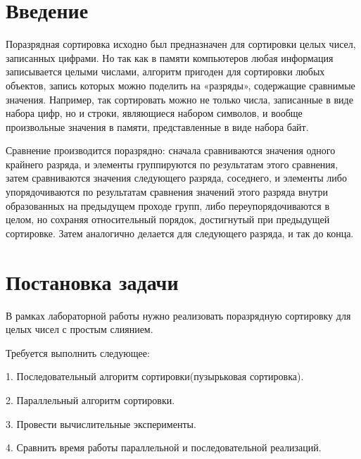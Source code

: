 \documentclass{report}
\begin{document}
\setcounter{page}{2}

\newpage

\section*{Введение}
Поразрядная сортировка исходно был предназначен для сортировки целых чисел, записанных цифрами. Но так как в памяти компьютеров любая информация записывается целыми числами, алгоритм пригоден для сортировки любых объектов, запись которых можно поделить на «разряды», содержащие сравнимые значения. Например, так сортировать можно не только числа, записанные в виде набора цифр, но и строки, являющиеся набором символов, и вообще произвольные значения в памяти, представленные в виде набора байт.
\par
Сравнение производится поразрядно: сначала сравниваются значения одного крайнего разряда, и элементы группируются по результатам этого сравнения, затем сравниваются значения следующего разряда, соседнего, и элементы либо упорядочиваются по результатам сравнения значений этого разряда внутри образованных на предыдущем проходе групп, либо переупорядочиваются в целом, но сохраняя относительный порядок, достигнутый при предыдущей сортировке. Затем аналогично делается для следующего разряда, и так до конца.
\newpage

\section*{Постановка задачи}
В рамках лабораторной работы нужно реализовать поразрядную сортировку для целых чисел с простым слиянием.
\par
Требуется выполнить следующее:
\par
1.	Последовательный алгоритм сортировки(пузырьковая сортировка).
\par
2.	Параллельный алгоритм сортировки.
\par
3.	Провести вычислительные эксперименты.
\par
4.	Сравнить время работы параллельной и последовательной реализаций.
\newpage

\end{document}
